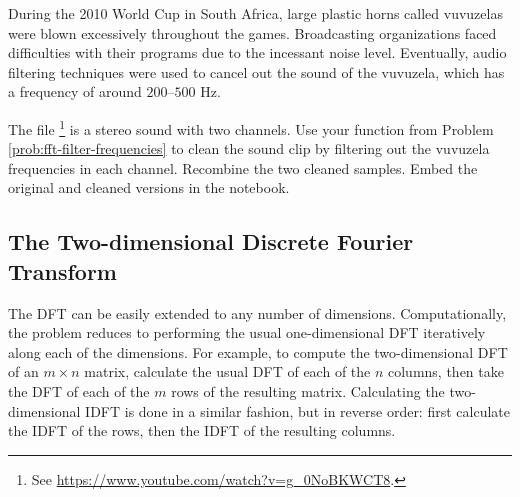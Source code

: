 

\begin{problem}
\label{prob:fft-vuvuzelas}
During the 2010 World Cup in South Africa, large plastic horns called vuvuzelas were blown excessively throughout the games.
Broadcasting organizations faced difficulties with their programs due to the incessant noise level.
Eventually, audio filtering techniques were used to cancel out the sound of the vuvuzela, which has a frequency of around $200$--$500$ Hz.

The file \footnote{See \url{https://www.youtube.com/watch?v=g_0NoBKWCT8}.} is a stereo sound with two channels.
Use your function from Problem \ref{prob:fft-filter-frequencies} to clean the sound clip by filtering out the vuvuzela frequencies in each channel.
Recombine the two cleaned samples.
Embed the original and cleaned versions in the notebook.
\end{problem}


\subsection*{The Two-dimensional Discrete Fourier Transform} %

The DFT can be easily extended to any number of dimensions.
Computationally, the problem reduces to performing the usual one-dimensional DFT iteratively along each of the dimensions.
For example, to compute the two-dimensional DFT of an $m \times n$ matrix, calculate the usual DFT of each of the $n$ columns, then take the DFT of each of the $m$ rows of the resulting matrix.
Calculating the two-dimensional IDFT is done in a similar fashion, but in reverse order: first calculate the IDFT of the rows, then the IDFT of the resulting columns.

